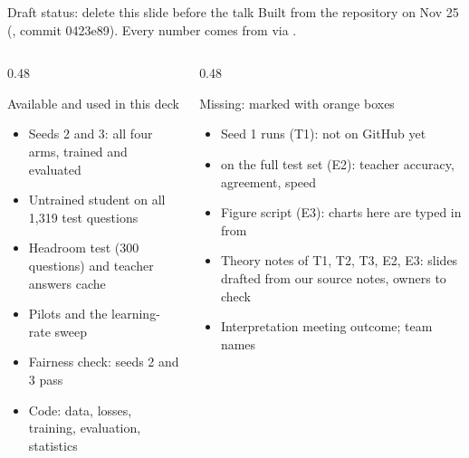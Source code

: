 \begin{frame}{Draft status: delete this slide before the talk\hfill{}}
  \footnotesize
  Built from the repository on Nov 25 (, commit 0423e89).
  Every number comes from  via .
  \vspace{0.15cm}
  \begin{columns}[T]
    \begin{column}{0.48\textwidth}
      \begin{block}{Available and used in this deck}
        \begin{itemize}\setlength{\itemsep}{1pt}
          \item Seeds 2 and 3: all four arms, trained and evaluated
          \item Untrained student on all 1,319 test questions
          \item Headroom test (300 questions) and teacher answers cache
          \item Pilots and the learning-rate sweep
          \item Fairness check: seeds 2 and 3 pass
          \item Code: data, losses, training, evaluation, statistics
        \end{itemize}
      \end{block}
    \end{column}
    \begin{column}{0.48\textwidth}
      \begin{alertblock}{Missing: marked with orange boxes}
        \begin{itemize}\setlength{\itemsep}{1pt}
          \item Seed 1 runs (T1): not on GitHub yet
          \item {} on the full test set (E2): teacher
                accuracy, agreement, speed
          \item Figure script  (E3): charts
                here are typed in from 
          \item Theory notes of T1, T2, T3, E2, E3: slides drafted from
                our source notes, owners to check
          \item Interpretation meeting outcome; team names
        \end{itemize}
      \end{alertblock}
    \end{column}
  \end{columns}
\end{frame}


